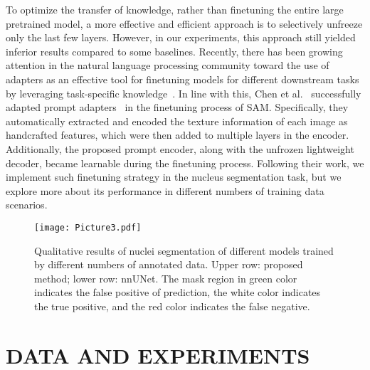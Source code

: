 \documentclass[conference]{IEEEtran}
\begin{document}
To optimize the transfer of knowledge, rather than finetuning the entire large pretrained model, a more effective and efficient approach is to selectively unfreeze only the last few layers. However, in our experiments, this approach still yielded inferior results compared to some baselines. Recently, there has been growing attention in the natural language processing community toward the use of adapters as an effective tool for finetuning models for different downstream tasks by leveraging task-specific knowledge~\cite{houlsby2019parameter}. In line with this, Chen et al.~\cite{chen2023sam} successfully adapted prompt adapters~\cite{liu2023explicit} in the finetuning process of SAM. Specifically, they automatically extracted and encoded the texture information of each image as handcrafted features, which were then added to multiple layers in the encoder. Additionally, the proposed prompt encoder, along with the unfrozen lightweight decoder, became learnable during the finetuning process. Following their work, we implement such finetuning strategy in the nucleus segmentation task, but we explore more about its performance in different numbers of training data scenarios.   


\begin{figure*}[] \label{figure3}
\begin{center}
\texttt{[image: Picture3.pdf]}
\end{center}
   \caption{Qualitative results of nuclei segmentation of different models trained by different numbers of annotated data. Upper row: proposed method; lower row: nnUNet. The mask region in green color indicates the false positive of prediction, the white color indicates the true positive, and the red color indicates the false negative.}
\label{fig2:Cross-modal}
\end{figure*}


\section{DATA AND EXPERIMENTS}
\end{document}
